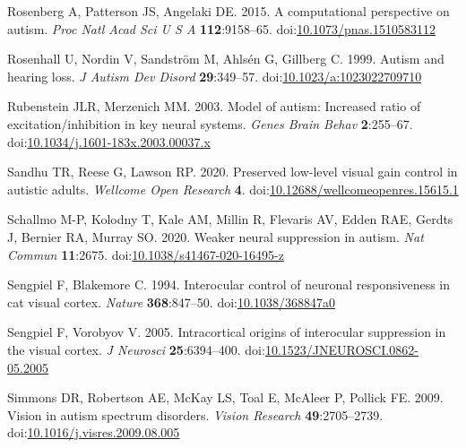\documentclass[
]{article}
\newlength{\cslhangindent}
\newlength{\cslentryspacingunit} %
\newenvironment{CSLReferences}[2] %
 {%
  \setlength{\parindent}{0pt}
  \ifodd #1
  \let\oldpar\par
  \def\par{\hangindent=\cslhangindent\oldpar}
  \fi
  \setlength{\parskip}{#2\cslentryspacingunit}
 }%
 {}
\begin{document}
\begin{CSLReferences}{1}{0}
\leavevmode{}%
Rosenberg A, Patterson JS, Angelaki DE. 2015. A computational perspective on autism. \emph{Proc Natl Acad Sci U S A} \textbf{112}:9158--65. doi:\href{https://doi.org/10.1073/pnas.1510583112}{10.1073/pnas.1510583112}

\leavevmode{}%
Rosenhall U, Nordin V, Sandström M, Ahlsén G, Gillberg C. 1999. Autism and hearing loss. \emph{J Autism Dev Disord} \textbf{29}:349--57. doi:\href{https://doi.org/10.1023/a:1023022709710}{10.1023/a:1023022709710}

\leavevmode{}%
Rubenstein JLR, Merzenich MM. 2003. Model of autism: Increased ratio of excitation/inhibition in key neural systems. \emph{Genes Brain Behav} \textbf{2}:255--67. doi:\href{https://doi.org/10.1034/j.1601-183x.2003.00037.x}{10.1034/j.1601-183x.2003.00037.x}

\leavevmode{}%
Sandhu TR, Reese G, Lawson RP. 2020. Preserved low-level visual gain control in autistic adults. \emph{Wellcome Open Research} \textbf{4}. doi:\href{https://doi.org/10.12688/wellcomeopenres.15615.1}{10.12688/wellcomeopenres.15615.1}

\leavevmode{}%
Schallmo M-P, Kolodny T, Kale AM, Millin R, Flevaris AV, Edden RAE, Gerdts J, Bernier RA, Murray SO. 2020. Weaker neural suppression in autism. \emph{Nat Commun} \textbf{11}:2675. doi:\href{https://doi.org/10.1038/s41467-020-16495-z}{10.1038/s41467-020-16495-z}

\leavevmode{}%
Sengpiel F, Blakemore C. 1994. Interocular control of neuronal responsiveness in cat visual cortex. \emph{Nature} \textbf{368}:847--50. doi:\href{https://doi.org/10.1038/368847a0}{10.1038/368847a0}

\leavevmode{}%
Sengpiel F, Vorobyov V. 2005. Intracortical origins of interocular suppression in the visual cortex. \emph{J Neurosci} \textbf{25}:6394--400. doi:\href{https://doi.org/10.1523/JNEUROSCI.0862-05.2005}{10.1523/JNEUROSCI.0862-05.2005}

\leavevmode{}%
Simmons DR, Robertson AE, McKay LS, Toal E, McAleer P, Pollick FE. 2009. Vision in autism spectrum disorders. \emph{Vision Research} \textbf{49}:2705--2739. doi:\href{https://doi.org/10.1016/j.visres.2009.08.005}{10.1016/j.visres.2009.08.005}


\end{CSLReferences}
\end{document}
